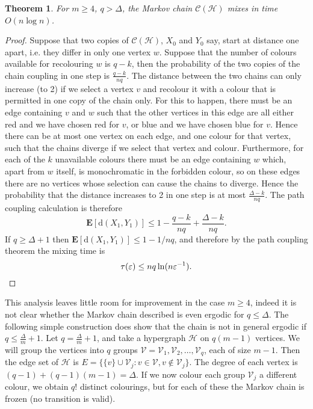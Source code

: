 \documentclass[11pt]{article}
\newtheorem{thm}{Theorem}[section]
\theoremstyle{definition}
\theoremstyle{remark}
\newcommand{\eps}{\varepsilon}
\newcommand{\e}{\mathbf{E}}
\newcommand{\C}{\mathcal{C}}
\newcommand{\CH}{\mathcal{H}}
\newcommand{\CV}{\mathcal{V}}
\begin{document}
\begin{thm}\label{colsmge4}
For $m\geq 4$, $q> \Delta$, the Markov chain $\C(\CH)$ mixes in time
$O(n\log n)$.
\end{thm}
\begin{proof}
Suppose that two copies of $\C(\CH)$, $X_0$ and $Y_0$ say, start at
distance one apart, i.e. they differ in only one vertex $w$. Suppose that
the number of colours available for recolouring $w$ is $q-k$, then the
probability of the two copies of the chain coupling in one step is
$\frac{q-k}{nq}$. The distance between the two chains can only increase (to
2) if we select a vertex $v$ and recolour it with a colour that is
permitted in one copy of the chain only. For this to happen, there must be
an edge containing $v$ and $w$ such that the other vertices in this edge
are all either red and we have chosen red for $v$, or blue and we have
chosen blue for $v$. Hence there can be at most one vertex on each edge,
and one colour for that vertex, such that the chains diverge if we select
that vertex and colour. Furthermore, for each of the $k$ unavailable
colours there must be an edge containing $w$ which, apart from $w$ itself,
is monochromatic in the forbidden colour, so on these edges there are no
vertices whose selection can cause the chains to diverge. Hence the
probability that the distance increases to 2 in one step is at most
$\frac{\Delta-k}{nq}$. The path coupling calculation is therefore
\[ \e[\mathrm{d}(X_1,Y_1)]\leq 1-\frac{q-k}{nq}+\frac{\Delta-k}{nq}.\]
If $q\geq\Delta+1$ then $\e[\mathrm{d}(X_1,Y_1)]\leq 1-1/nq$, and therefore
by the path coupling theorem the mixing time is
\[ \tau(\eps)\leq nq \ln (n \eps^{-1}).\vspace{-\baselineskip}\]
\end{proof}

This analysis leaves little room for improvement in the case $m\geq 4$,
indeed it is not clear whether the Markov chain described is even ergodic
for $q\leq \Delta$. The following simple construction does show that the
chain is not in general ergodic if $q\leq \frac{\Delta}{m}+1$. Let
$q=\frac{\Delta }{m }+1$, and take a hypergraph $\CH$ on $q(m-1)$ vertices.
We will group the vertices into $q$ groups $\CV=\CV_1,\CV_2,\ldots,\CV_q$,
each of size $m-1$. Then the edge set of $\CH$ is $E=\{\{v\}\cup \CV_j:v\in
\CV, v\not\in \CV_j\}$. The degree of each vertex is
$(q-1)+(q-1)(m-1)=\Delta$. If we now colour each group $\CV_j$ a different
colour, we obtain $q!$ distinct colourings, but for each of these the
Markov chain is frozen (no transition is valid).
\end{document}
